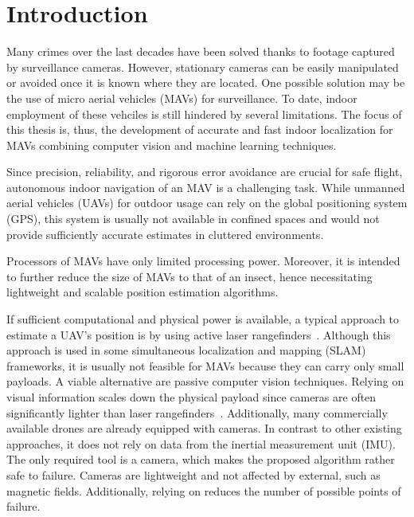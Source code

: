 \chapter{Introduction}
\label{chap:introduction}

Many crimes over the last decades have been solved thanks to footage
captured by surveillance cameras. However, stationary cameras can be
easily manipulated or avoided once it is known where they are
located. One possible solution may be the use of micro aerial vehicles
(MAVs) for surveillance. To date, indoor employment of these vehciles
is still hindered by several limitations. The focus of this thesis is,
thus, the development of accurate and fast indoor localization for
MAVs combining computer vision and machine learning techniques.

Since precision, reliability, and rigorous error avoidance are crucial
for safe flight, autonomous indoor navigation of an MAV is a
challenging task. While unmanned aerial vehicles (UAVs) for
outdoor usage can rely on the global positioning system (GPS), this system is
usually not available in confined spaces and would not provide
sufficiently accurate estimates in cluttered environments.


Processors of MAVs have only limited processing power. Moreover,
it is intended to further reduce the size of MAVs to that of an
insect, hence necessitating lightweight and scalable position
estimation algorithms.

If sufficient computational and physical power is available, a typical
approach to estimate a UAV's position is by using active laser
rangefinders~\cite{grzonka2009towards,bachrach2009autonomous}.
Although this approach is used in some simultaneous localization and
mapping (SLAM) frameworks, it is usually not feasible for MAVs because
they can carry only small payloads. A viable alternative are passive
computer vision techniques. Relying on visual information scales down
the physical payload since cameras are often significantly lighter
than laser
rangefinders~\cite{blosch2010vision,angeli20062d,ahrens2009vision}.
Additionally, many commercially available drones are already equipped
with cameras. In contrast to other existing approaches, it does not rely on data from the inertial measurement unit (IMU). The only required tool is a camera, which makes the proposed algorithm rather safe to failure. Cameras are lightweight and not affected by external, such as magnetic fields. Additionally, relying on reduces the number of possible points of failure.  

